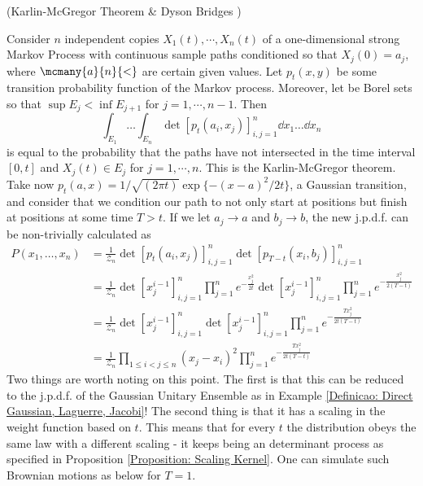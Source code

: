 \begin{exemplo} (Karlin-McGregor Theorem \& Dyson Bridges \cite{ArnoNotes})
	
	Consider $n$ independent copies $X_1(t), \cdots, X_n(t)$ of a one-dimensional strong Markov Process with continuous sample paths conditioned so that $X_j(0) = a_j$, where $\mcmany{a}{n}{<}$ are certain given values. Let $p_t(x, y)$ be some transition probability function of the Markov process. Moreover, let  be Borel sets so that $\sup{E_j} < \inf{E_{j+1}}$ for $j = 1, \cdots, n-1$. Then
	\begin{equation}
		\int_{E_1} \dots \int_{E_n} \det{[p_t(a_i, x_j)]^{n}_{i,j=1}}  \dd x_1 \dots \dd x_n
	\end{equation} 
	is equal to the probability that the paths have not intersected in the time interval $[0,t]$ and $X_j(t) \in E_j$ for $j = 1, \cdots, n.$ This is the Karlin-McGregor theorem. Take now $p_t(a, x) = 1/\sqrt{(2\pi t)} \exp\{-(x-a)^2/2t\}$, a Gaussian transition, and consider that we condition our path to not only start at positions  but finish at positions  at some time $T > t$. If we let $a_j \rightarrow a$ and $b_j \rightarrow b$, the new j.p.d.f. can be non-trivially calculated as
	\begin{align}
			P(x_1, \dots, x_n)
			& = \frac{1}{\mathcal{Z}_n} \det{[p_t(a_i, x_j)]^{n}_{i,j=1}} \det{[p_{T-t}(x_i, b_j)]^{n}_{i,j=1}} \\
			& = \frac{1}{\mathcal{Z}_n} \det{[x_{j}^{i-1}]}^{n}_{i,j=1} \prod_{j=1}^{n} e^{-\frac{x_j^2}{2t}} \det{[x_{j}^{i-1}]}^{n}_{i,j=1} \prod_{j=1}^{n} e^{-\frac{x_j^2}{2(T-t)}} \\
			& =\frac{1}{\mathcal{Z}_n} \det{[x_{j}^{i-1}]}^{n}_{i,j=1} \det{[x_{j}^{i-1}]}^{n}_{i,j=1} \prod_{j=1}^{n} e^{-\frac{T x_j^2}{2t(T-t)}} \\
			& =\frac{1}{\mathcal{Z}_n} \prod_{1\leq i < j \leq n} (x_j - x_i)^2 \prod_{j=1}^{n} e^{-\frac{T x_j^2}{2t(T-t)}}
	\end{align}
	Two things are worth noting on this point. The first is that this can be reduced to the j.p.d.f. of the Gaussian Unitary Ensemble as in Example \ref{Definicao: Direct Gaussian, Laguerre, Jacobi}! The second thing is that it has a scaling in the weight function based on $t$. This means that for every $t$ the distribution obeys the same law with a different scaling - it keeps being an determinant process as specified in Proposition \ref{Proposition: Scaling Kernel}. One can simulate such Brownian motions as below for $T = 1$.
	\begin{figure}[H]

\end{figure}
\end{exemplo}
